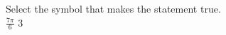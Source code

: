 \documentclass{ximera}
\author{David Kish}
\begin{document}
\begin{exercise}
Select the symbol that makes the statement true.\\
$\frac{7\pi}{6}$ \wordChoice{\choice{$<$}\choice[correct]{$>$}\choice{$=$}} $3$ 

\end{exercise}
\end{document}
